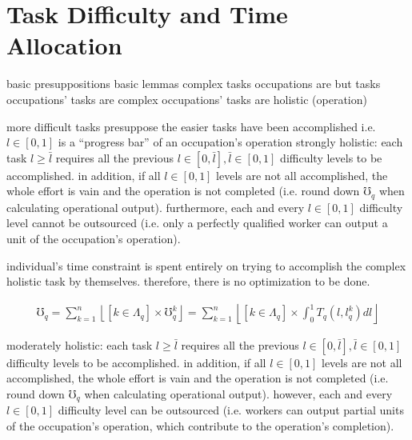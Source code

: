 \documentclass[hidelinks, nonatbib]{elsarticle}
\begin{document}
\section{Task Difficulty and Time Allocation}
\begin{definition}
    \label{ta}
\end{definition} 


basic presuppositions
basic lemmas
complex tasks
occupations are but tasks
occupations' tasks are complex
occupations' tasks are holistic (operation)

more difficult tasks presuppose the easier tasks have been accomplished
i.e. $l \in [0,1]$ is a ``progress bar'' of an occupation's operation
strongly holistic: each task $l \geq \bar{l}$ requires all the previous $l \in [0, \bar{l}], \bar{l} \in [0,1]$ difficulty levels to be accomplished. in addition, if all $l \in [0,1]$ levels are not all accomplished, the whole effort is vain and the operation is not completed (i.e. round down $\mho_q$ when calculating operational output). furthermore, each and every $l \in [0,1]$ difficulty level cannot be outsourced (i.e. only a perfectly qualified worker can output a unit of the occupation's operation).

individual's time constraint is spent entirely on trying to accomplish the complex holistic task by themselves. therefore, there is no optimization to be done.

\begin{align*}
    \mho_q 
    = 
    \sum_{k=1}^{n}{
        \left\lfloor
            [k \in \Lambda_q]
            \times
            \mho_{q}^{k}
        \right\rfloor
    }
    = 
    \sum_{k=1}^{n}{
        \left\lfloor
            [k \in \Lambda_q]
            \times
            \int_{0}^{1}{
                T_{q}(l,l_{q}^{k})
                dl
            }
        \right\rfloor
    }
\end{align*}

moderately holistic: each task $l \geq \bar{l}$ requires all the previous $l \in [0, \bar{l}], \bar{l} \in [0,1]$ difficulty levels to be accomplished. in addition, if all $l \in [0,1]$ levels are not all accomplished, the whole effort is vain and the operation is not completed (i.e. round down $\mho_q$ when calculating operational output). however, each and every $l \in [0,1]$ difficulty level can be outsourced (i.e. workers can output partial units of the occupation's operation, which contribute to the operation's completion).
    
\end{document}
